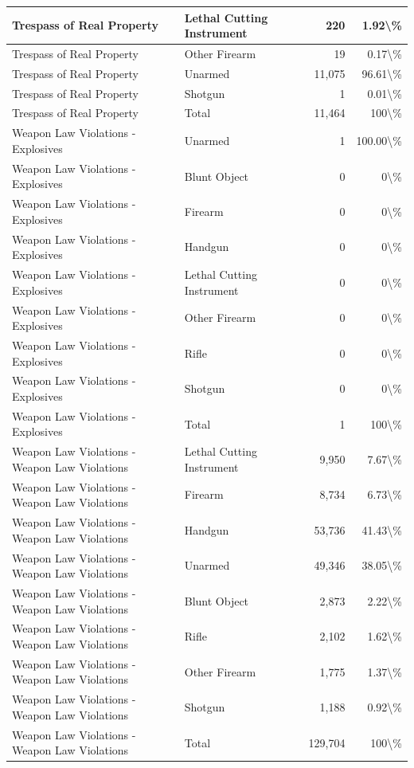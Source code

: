\documentclass[
]{krantz}
\begin{document}
\begin{longtable}[t]{l|l|r|r}
\hline
Trespass of Real Property & Lethal Cutting Instrument & 220 & 1.92\textbackslash{}\%\\
\hline
Trespass of Real Property & Other Firearm & 19 & 0.17\textbackslash{}\%\\
\hline
Trespass of Real Property & Unarmed & 11,075 & 96.61\textbackslash{}\%\\
\hline
Trespass of Real Property & Shotgun & 1 & 0.01\textbackslash{}\%\\
\hline
Trespass of Real Property & Total & 11,464 & 100\textbackslash{}\%\\
\hline
Weapon Law Violations - Explosives & Unarmed & 1 & 100.00\textbackslash{}\%\\
\hline
Weapon Law Violations - Explosives & Blunt Object & 0 & 0\textbackslash{}\%\\
\hline
Weapon Law Violations - Explosives & Firearm & 0 & 0\textbackslash{}\%\\
\hline
Weapon Law Violations - Explosives & Handgun & 0 & 0\textbackslash{}\%\\
\hline
Weapon Law Violations - Explosives & Lethal Cutting Instrument & 0 & 0\textbackslash{}\%\\
\hline
Weapon Law Violations - Explosives & Other Firearm & 0 & 0\textbackslash{}\%\\
\hline
Weapon Law Violations - Explosives & Rifle & 0 & 0\textbackslash{}\%\\
\hline
Weapon Law Violations - Explosives & Shotgun & 0 & 0\textbackslash{}\%\\
\hline
Weapon Law Violations - Explosives & Total & 1 & 100\textbackslash{}\%\\
\hline
Weapon Law Violations - Weapon Law Violations & Lethal Cutting Instrument & 9,950 & 7.67\textbackslash{}\%\\
\hline
Weapon Law Violations - Weapon Law Violations & Firearm & 8,734 & 6.73\textbackslash{}\%\\
\hline
Weapon Law Violations - Weapon Law Violations & Handgun & 53,736 & 41.43\textbackslash{}\%\\
\hline
Weapon Law Violations - Weapon Law Violations & Unarmed & 49,346 & 38.05\textbackslash{}\%\\
\hline
Weapon Law Violations - Weapon Law Violations & Blunt Object & 2,873 & 2.22\textbackslash{}\%\\
\hline
Weapon Law Violations - Weapon Law Violations & Rifle & 2,102 & 1.62\textbackslash{}\%\\
\hline
Weapon Law Violations - Weapon Law Violations & Other Firearm & 1,775 & 1.37\textbackslash{}\%\\
\hline
Weapon Law Violations - Weapon Law Violations & Shotgun & 1,188 & 0.92\textbackslash{}\%\\
\hline
Weapon Law Violations - Weapon Law Violations & Total & 129,704 & 100\textbackslash{}\%\\
\hline
\end{longtable}
\end{document}
